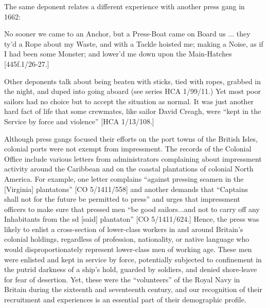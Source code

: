 The same deponent relates a different experience with another press gang in 1662:

No sooner we came to an Anchor, but a Press-Boat came on Board us ... they ty’d a Rope about my Waste, and with a Tackle hoisted me; making a Noise, as if I had been some Monster; and lower’d me down upon the Main-Hatches [445f.1/26-27.]

Other deponents talk about being beaten with sticks, tied with ropes, grabbed in the night, and duped into going aboard (see series HCA 1/99/11.) Yet most poor sailors had no choice but to accept the situation as normal. It was just another hard fact of life that some crewmates, like sailor David Creagh, were “kept in the Service by force and violence” [HCA 1/13/108.] 

  Although press gangs focused their efforts on the port towns of the British Isles, colonial ports were not exempt from impressment. The records of the Colonial Office include various letters from administrators complaining about impressment activity around the Caribbean and on the coastal plantations of colonial North America. For example, one letter complains “against pressing seamen in the [Virginia] plantatons” [CO 5/1411/558] and another demands that “Captains shall not for the future be permitted to press” and urges that impressment officers to make sure that pressed men “be good sailors...and not to carry off any Inhabitants from the sd [said] plantaton” [CO 5/1411/624.] Hence, the press was likely to enlist a cross-section of lower-class workers in and around Britain’s colonial holdings, regardless of profession, nationality, or native language who would disproportionately represent lower-class men of working age. These men were enlisted and kept in service by force, potentially subjected to confinement in the putrid darkness of a ship’s hold, guarded by soldiers, and denied shore-leave for fear of desertion. Yet, these were the “volunteers” of the Royal Navy in Britain during the sixteenth and seventeenth century, and our recognition of their recruitment and experiences is an essential part of their demographic profile.  

